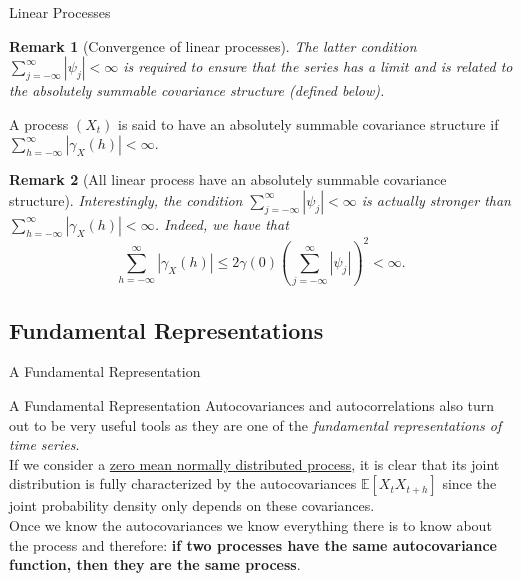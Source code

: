 \documentclass[envcountsect,usenames,dvipsnames]{beamer}
\theoremstyle{mystyle}
\newtheorem{Remark}{Remark}
\begin{document}
\begin{frame}{Linear Processes}
\scriptsize

\begin{Remark}[Convergence of linear processes]
The latter condition $\sum\limits_{j = - \infty }^\infty {\left| {{\psi _j}} \right|} < \infty$ is required to ensure that the series has a limit and is related to the absolutely summable covariance structure (defined below).
\end{Remark}


\begin{Definition}
\label{def:abs:sum}
A process $(X_t)$ is said to have an absolutely summable covariance structure if $\sum\limits_{h = - \infty }^\infty {\left| \gamma_X(h) \right|} < \infty$.
\end{Definition}

\begin{Remark}[All linear process have an absolutely summable covariance structure]
Interestingly, the condition $\sum\limits_{j = - \infty }^\infty {\left| {{\psi _j}} \right|} < \infty$ is actually stronger than $\sum\limits_{h = - \infty }^\infty {\left| \gamma_X(h) \right|} < \infty $. Indeed, we have that
%
\begin{equation*}
    \sum\limits_{h = - \infty }^\infty {\left| \gamma_X(h) \right|} \leq 2 \gamma(0) \left( \sum\limits_{j = - \infty }^\infty {\left| {{\psi _j}} \right|} \right)^2 < \infty.
\end{equation*}
%
\end{Remark}

\end{frame}

\subsection{Fundamental Representations}

\begin{frame}{A Fundamental Representation}
    
\begin{alertblock}{A Fundamental Representation}
Autocovariances and autocorrelations also turn out to be very useful tools as they are one of the \textit{fundamental representations of time series}.\\[0.2cm]

If we consider a \underline{zero mean normally distributed process}, it is clear that its joint distribution is fully characterized by the autocovariances $\mathbb{E}[X_t X_{t+h}]$ since the joint probability density only depends on these covariances.\\[0.2cm]

Once we know the autocovariances we know everything there is to know about the process and therefore: \textbf{if two processes have the same autocovariance function, then they are the same process}.
\end{alertblock}

\end{frame}
\end{document}
